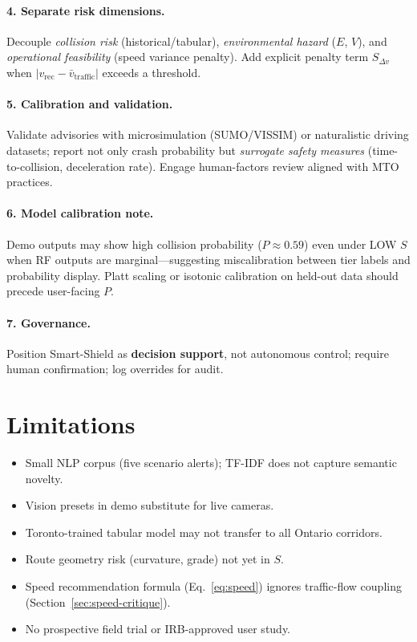 \documentclass[11pt,a4paper]{article}
\begin{document}
\paragraph{4. Separate risk dimensions.}
Decouple \emph{collision risk} (historical/tabular), \emph{environmental hazard} ($E$, $V$), and \emph{operational feasibility} (speed variance penalty). Add explicit penalty term $S_{\Delta v}$ when $|v_{\text{rec}} - \bar{v}_{\text{traffic}}|$ exceeds a threshold.

\paragraph{5. Calibration and validation.}
Validate advisories with microsimulation (SUMO/VISSIM) or naturalistic driving datasets; report not only crash probability but \emph{surrogate safety measures} (time-to-collision, deceleration rate). Engage human-factors review aligned with MTO practices.

\paragraph{6. Model calibration note.}
Demo outputs may show high collision probability ($P \approx 0.59$) even under LOW $S$ when RF outputs are marginal---suggesting miscalibration between tier labels and probability display. Platt scaling or isotonic calibration on held-out data should precede user-facing $P$.

\paragraph{7. Governance.}
Position Smart-Shield as \textbf{decision support}, not autonomous control; require human confirmation; log overrides for audit.

\section{Limitations}
\label{sec:limits}

\begin{itemize}[noitemsep]
  \item Small NLP corpus (five scenario alerts); TF-IDF does not capture semantic novelty.
  \item Vision presets in demo substitute for live cameras.
  \item Toronto-trained tabular model may not transfer to all Ontario corridors.
  \item Route geometry risk (curvature, grade) not yet in $S$.
  \item Speed recommendation formula (Eq.~\eqref{eq:speed}) ignores traffic-flow coupling (Section~\ref{sec:speed-critique}).
  \item No prospective field trial or IRB-approved user study.
\end{itemize}
\end{document}
